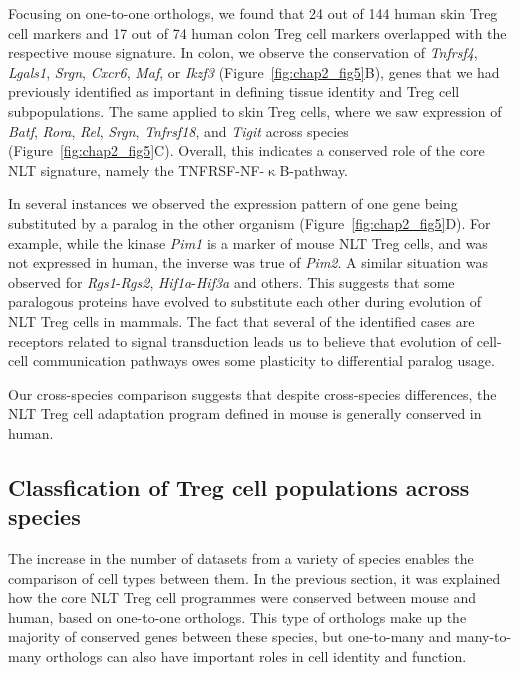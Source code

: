 Focusing on one-to-one orthologs, we found that 24 out of 144 human skin Treg cell markers and 17 out of 74 human colon Treg cell markers overlapped with the respective mouse signature. In colon, we observe the conservation of \textit{Tnfrsf4}, \textit{Lgals1}, \textit{Srgn}, \textit{Cxcr6}, \textit{Maf}, or \textit{Ikzf3} (Figure~\ref{fig:chap2_fig5}B), genes that we had previously identified as important in defining tissue identity and Treg cell subpopulations. The same applied to skin Treg cells, where we saw expression of \textit{Batf}, \textit{Rora}, \textit{Rel}, \textit{Srgn}, \textit{Tnfrsf18}, and \textit{Tigit} across species (Figure~\ref{fig:chap2_fig5}C). Overall, this indicates a conserved role of the core NLT signature, namely the TNFRSF-NF-${\upkappa}$B-pathway.

In several instances we observed the expression pattern of one gene being substituted by a paralog in the other organism (Figure~\ref{fig:chap2_fig5}D). For example, while the kinase \textit{Pim1} is a marker of mouse NLT Treg cells, and was not expressed in human, the inverse was true of \textit{Pim2}. A similar situation was observed for \textit{Rgs1}-\textit{Rgs2}, \textit{Hif1a}-\textit{Hif3a} and others. This suggests that some paralogous proteins have evolved to substitute each other during evolution of NLT Treg cells in mammals. The fact that several of the identified cases are receptors related to signal transduction leads us to believe that evolution of cell-cell communication pathways owes some plasticity to differential paralog usage.

Our cross-species comparison suggests that despite cross-species differences, the NLT Treg cell adaptation program defined in mouse is generally conserved in human. 


\subsection{Classfication of Treg cell populations across species}
\label{section2.2.6}
The increase in the number of datasets from a variety of species enables the comparison of cell types between them. In the previous section, it was explained how the core NLT Treg cell programmes were conserved between mouse and human, based on one-to-one orthologs. This type of orthologs make up the majority of conserved genes between these species, but one-to-many and many-to-many orthologs can also have important roles in cell identity and function.

